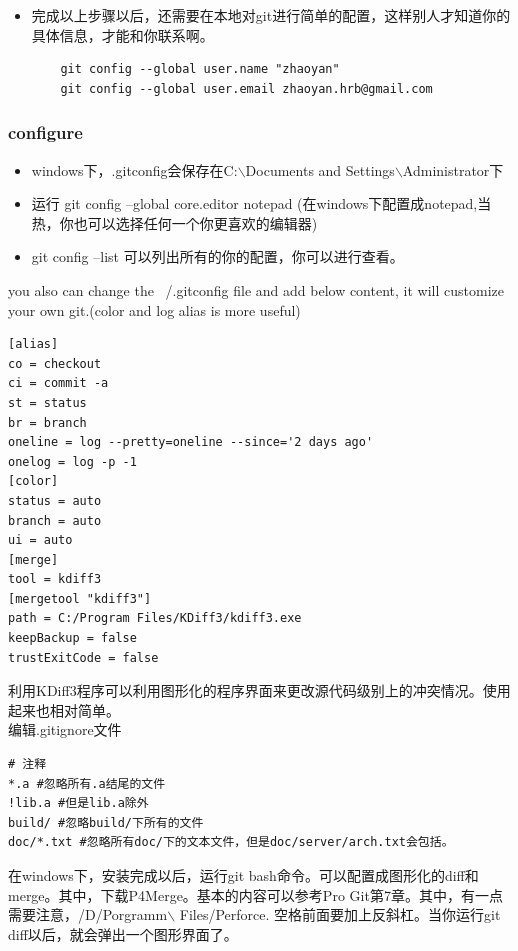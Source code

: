 \documentclass[a4paper,12pt,twoside]{book}
\begin{document}
\begin{CJK*}{UTF8}{song}
\begin{itemize}
    \item 完成以上步骤以后，还需要在本地对git进行简单的配置，这样别人才知道你的具体信息，才能和你联系啊。

    \begin{verbatim}
	git config --global user.name "zhaoyan"
	git config --global user.email zhaoyan.hrb@gmail.com
	\end{verbatim}
\end{itemize}

\subsubsection{configure}
    \begin{itemize}
    \item windows下，.gitconfig会保存在C:$\backslash$Documents and Settings$\backslash$Administrator下
    \item 运行 git config --global core.editor notepad (在windows下配置成notepad,当热，你也可以选择任何一个你更喜欢的编辑器)
    \item git config --list 可以列出所有的你的配置，你可以进行查看。
    \end{itemize}
    you also can change the ~/.gitconfig file and add below content, it will customize your own git.(color and log alias is more useful)

\begin{verbatim}
[alias]
co = checkout
ci = commit -a
st = status
br = branch
oneline = log --pretty=oneline --since='2 days ago'
onelog = log -p -1
[color]
status = auto
branch = auto
ui = auto
[merge]
tool = kdiff3
[mergetool "kdiff3"]
path = C:/Program Files/KDiff3/kdiff3.exe
keepBackup = false
trustExitCode = false	
\end{verbatim}
    利用KDiff3程序可以利用图形化的程序界面来更改源代码级别上的冲突情况。使用起来也相对简单。\\
编辑.gitignore文件
\begin{verbatim}
# 注释
*.a #忽略所有.a结尾的文件
!lib.a #但是lib.a除外
build/ #忽略build/下所有的文件
doc/*.txt #忽略所有doc/下的文本文件，但是doc/server/arch.txt会包括。
\end{verbatim}

在windows下，安装完成以后，运行git bash命令。可以配置成图形化的diff和merge。其中，下载P4Merge。基本的内容可以参考Pro Git第7章。其中，有一点需要注意，/D/Porgramm$\backslash$ Files/Perforce. 空格前面要加上反斜杠。当你运行git diff以后，就会弹出一个图形界面了。


\end{CJK*}
\end{document}
